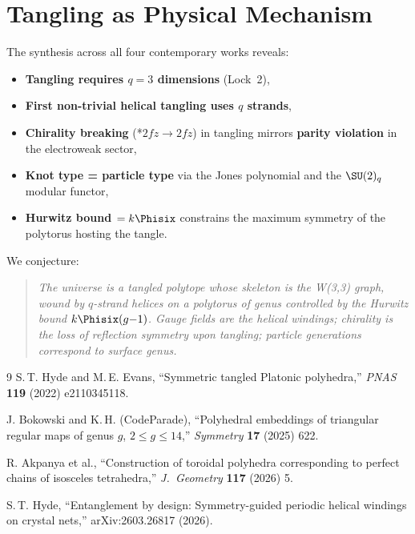 \section{Tangling as Physical Mechanism}
\label{sec:tangling-physics}

The synthesis across all four contemporary works reveals:
\begin{itemize}[nosep]
\item \textbf{Tangling requires $q=3$ dimensions} (Lock~2),
\item \textbf{First non-trivial helical tangling uses $q$ strands},
\item \textbf{Chirality breaking} (*$2fz \to 2fz$) in tangling
  mirrors \textbf{parity violation} in the electroweak sector,
\item \textbf{Knot type = particle type} via the Jones polynomial
  and the $\SU(2)_q$ modular functor,
\item \textbf{Hurwitz bound $= k\Phisix$} constrains the maximum
  symmetry of the polytorus hosting the tangle.
\end{itemize}

We conjecture:
\begin{quote}
\emph{The universe is a tangled polytope whose skeleton is the W(3,3)
graph, wound by $q$-strand helices on a polytorus of genus controlled
by the Hurwitz bound $k\Phisix(g{-}1)$. Gauge fields are the helical
windings; chirality is the loss of reflection symmetry upon tangling;
particle generations correspond to surface genus.}
\end{quote}

\begin{thebibliography}{9}
 S.\,T. Hyde and M.\,E. Evans,
  ``Symmetric tangled Platonic polyhedra,''
  \emph{PNAS} \textbf{119} (2022) e2110345118.

 J. Bokowski and K.\,H. (CodeParade),
  ``Polyhedral embeddings of triangular regular maps of genus $g$, $2\leq g\leq 14$,''
  \emph{Symmetry} \textbf{17} (2025) 622.

 R. Akpanya et al.,
  ``Construction of toroidal polyhedra corresponding to perfect chains of
  isosceles tetrahedra,'' \emph{J.\ Geometry} \textbf{117} (2026) 5.

 S.\,T. Hyde,
  ``Entanglement by design: Symmetry-guided periodic helical windings on crystal nets,''
  arXiv:2603.26817 (2026).
\end{thebibliography}
